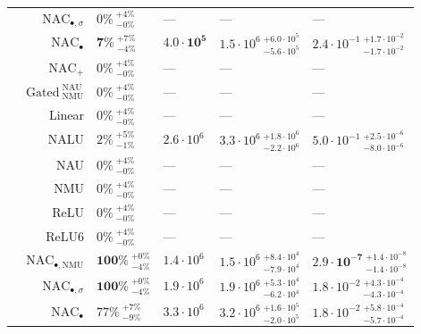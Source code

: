 \begin{longtable}{crllll}
\nopagebreak
 & $\mathrm{NAC}_{\bullet,\sigma}$ & $0\% {~}^{+4\%}_{-0\%}$ & --- & --- & ---\\

\nopagebreak
 & $\mathrm{NAC}_{\bullet}$ & $\mathbf{7\%} {~}^{+7\%}_{-4\%}$ & $\mathbf{4.0 \cdot 10^{5}}$ & $1.5 \cdot 10^{6} {~}^{+6.0 \cdot 10^{5}}_{-5.6 \cdot 10^{5}}$ & $2.4 \cdot 10^{-1} {~}^{+1.7 \cdot 10^{-2}}_{-1.7 \cdot 10^{-2}}$\\

\nopagebreak
 & $\mathrm{NAC}_{+}$ & $0\% {~}^{+4\%}_{-0\%}$ & --- & --- & ---\\

\nopagebreak
 & $\mathrm{Gated~}^{\mathrm{NAU}}_{\mathrm{NMU}}$ & $0\% {~}^{+4\%}_{-0\%}$ & --- & --- & ---\\

\nopagebreak
 & Linear & $0\% {~}^{+4\%}_{-0\%}$ & --- & --- & ---\\

\nopagebreak
 & NALU & $2\% {~}^{+5\%}_{-1\%}$ & $2.6 \cdot 10^{6}$ & $3.3 \cdot 10^{6} {~}^{+1.8 \cdot 10^{6}}_{-2.2 \cdot 10^{6}}$ & $5.0 \cdot 10^{-1} {~}^{+2.5 \cdot 10^{-6}}_{-8.0 \cdot 10^{-6}}$\\

\nopagebreak
 & NAU & $0\% {~}^{+4\%}_{-0\%}$ & --- & --- & ---\\

\nopagebreak
 & NMU & $0\% {~}^{+4\%}_{-0\%}$ & --- & --- & ---\\

\nopagebreak
 & ReLU & $0\% {~}^{+4\%}_{-0\%}$ & --- & --- & ---\\

\nopagebreak
\multirow{-11}{*}{\centering\arraybackslash $\sqrt{z}$} & ReLU6 & $0\% {~}^{+4\%}_{-0\%}$ & --- & --- & ---\\
\cmidrule{1-6}
 & $\mathrm{NAC}_{\bullet,\mathrm{NMU}}$ & $\mathbf{100\%} {~}^{+0\%}_{-4\%}$ & $1.4 \cdot 10^{6}$ & $1.5 \cdot 10^{6} {~}^{+8.4 \cdot 10^{4}}_{-7.9 \cdot 10^{4}}$ & $\mathbf{2.9 \cdot 10^{-7}} {~}^{+1.4 \cdot 10^{-8}}_{-1.4 \cdot 10^{-8}}$\\

\nopagebreak
 & $\mathrm{NAC}_{\bullet,\sigma}$ & $\mathbf{100\%} {~}^{+0\%}_{-4\%}$ & $1.9 \cdot 10^{6}$ & $1.9 \cdot 10^{6} {~}^{+5.3 \cdot 10^{4}}_{-6.2 \cdot 10^{4}}$ & $1.8 \cdot 10^{-2} {~}^{+4.3 \cdot 10^{-4}}_{-4.3 \cdot 10^{-4}}$\\

\nopagebreak
 & $\mathrm{NAC}_{\bullet}$ & $77\% {~}^{+7\%}_{-9\%}$ & $3.3 \cdot 10^{6}$ & $3.2 \cdot 10^{6} {~}^{+1.6 \cdot 10^{5}}_{-2.0 \cdot 10^{5}}$ & $1.8 \cdot 10^{-2} {~}^{+5.8 \cdot 10^{-4}}_{-5.7 \cdot 10^{-4}}$\\


\end{longtable}
